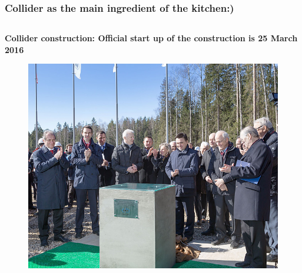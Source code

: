 \documentclass[dvipsnames] {beamer}
\begin{document}
\begin{frame}
  \frametitle{\bf \centering Collider as the main ingredient of the kitchen:)}
  \vskip -0.75cm
  \begin{columns}[t]
    
     \begin{block}{\bf \centering Collider construction: Official start up of the construction is {\color{red} 25 March 2016}}
      \begin{figure}[H]
        \includegraphics[width=1.\linewidth]{collider_start.jpg} 
      \end{figure}
     \end{block}

     
  \end{columns}
\end{frame}
\end{document}
